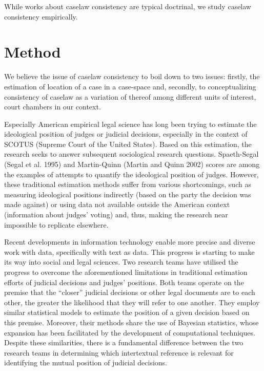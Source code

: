 \documentclass[
  11pt,
]{article}
\begin{document}
While works about caselaw consistency are typical doctrinal, we study
caselaw consistency empirically.

\hypertarget{method}{%
\section{Method}\label{method}}

We believe the issue of caselaw consistency to boil down to two issues:
firstly, the estimation of location of a case in a case-space and,
secondly, to conceptualizing consistency of caselaw as a variation of
thereof among different units of interest, court chambers in our
context.

Especially American empirical legal science has long been trying to
estimate the ideological position of judges or judicial decisions,
especially in the context of SCOTUS (Supreme Court of the United
States). Based on this estimation, the research seeks to answer
subsequent sociological research questions. Spaeth-Segal (Segal et al.
1995) and Martin-Quinn (Martin and Quinn 2002) scores are among the
examples of attempts to quantify the ideological position of judges.
However, these traditional estimation methods suffer from various
shortcomings, such as measuring ideological positions indirectly (based
on the party the decision was made against) or using data not available
outside the American context (information about judges' voting) and,
thus, making the research near impossible to replicate elsewhere.

Recent developments in information technology enable more precise and
diverse work with data, specifically with text as data. This progress is
starting to make its way into social and legal sciences. Two research
teams have utilised the progress to overcome the aforementioned
limitations in traditional estimation efforts of judicial decisions and
judges' positions. Both teams operate on the premise that the ``closer''
judicial decisions or other legal documents are to each other, the
greater the likelihood that they will refer to one another. They employ
similar statistical models to estimate the position of a given decision
based on this premise. Moreover, their methods share the use of Bayesian
statistics, whose expansion has been facilitated by the development of
computational techniques. Despite these similarities, there is a
fundamental difference between the two research teams in determining
which intertextual reference is relevant for identifying the mutual
position of judicial decisions.
\end{document}
